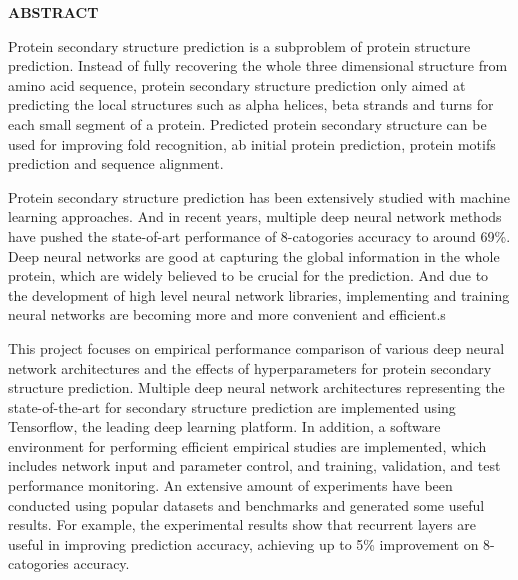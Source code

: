 \newpage
{}

\centerline{\bf \large ABSTRACT}
\vskip 10mm %
Protein secondary structure prediction is a subproblem of protein structure prediction. Instead of fully recovering the whole three dimensional structure from amino acid sequence, protein secondary structure prediction only aimed at predicting the local structures such as alpha helices, beta strands and turns for each small segment of a protein. Predicted protein secondary structure can be used for improving fold recognition, ab initial protein prediction, protein motifs prediction and sequence alignment.

Protein secondary structure prediction has been extensively studied with machine learning approaches. And in recent years, multiple deep neural network methods have pushed the state-of-art performance of 8-catogories accuracy to around 69\%. Deep neural networks are good at capturing the global information in the whole protein, which are widely believed to be crucial for the prediction. And due to the development of high level neural network libraries, implementing and training neural networks are becoming more and more convenient and efficient.s

This project focuses on empirical performance comparison of various deep neural network architectures and the effects of hyperparameters for protein secondary structure prediction. Multiple deep neural network architectures representing the state-of-the-art for secondary structure prediction are implemented using Tensorflow, the leading deep learning platform. In addition, a software environment for performing efficient empirical studies are implemented, which includes network input and parameter control, and training, validation,  and test performance monitoring. An extensive amount of experiments have been conducted using popular datasets and benchmarks and generated some useful results. For example,  the experimental results show that recurrent layers are useful in improving prediction accuracy, achieving up to 5\% improvement on 8-catogories accuracy.